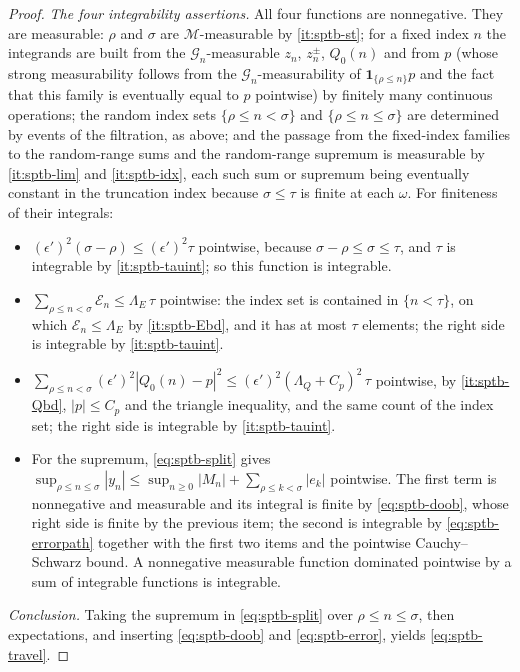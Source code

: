 \begin{proof}
\emph{The four integrability assertions.} All four functions are nonnegative.
They are measurable: $\rho$ and $\sigma$ are $\mathcal M$-measurable by
\ref{it:sptb-st}; for a fixed index $n$ the integrands are built from the
$\mathcal G_n$-measurable $z_n$, $z^\pm_n$, $Q_0(n)$ and from $p$ (whose
strong measurability follows from the $\mathcal G_n$-measurability of
$\mathbf1_{\{\rho\le n\}}p$ and the fact that this family is eventually equal to
$p$ pointwise) by finitely many continuous operations; the random index sets
$\{\rho\le n<\sigma\}$ and $\{\rho\le n\le\sigma\}$ are determined by events of
the filtration, as above; and the passage from the fixed-index families to the
random-range sums and the random-range supremum is measurable by
\ref{it:sptb-lim} and \ref{it:sptb-idx}, each such sum or supremum being
eventually constant in the truncation index because $\sigma\le\tau$ is finite at
each $\omega$. For finiteness of their integrals:
\begin{itemize}
\item $(\epsilon')^2(\sigma-\rho)\le(\epsilon')^2\tau$ pointwise, because
$\sigma-\rho\le\sigma\le\tau$, and $\tau$ is integrable by
\ref{it:sptb-tauint}; so this function is integrable.
\item $\sum_{\rho\le n<\sigma}\mathcal E_n\le\Lambda_E\,\tau$ pointwise: the
index set is contained in $\{n<\tau\}$, on which $\mathcal E_n\le\Lambda_E$ by
\ref{it:sptb-Ebd}, and it has at most $\tau$ elements; the right side is
integrable by \ref{it:sptb-tauint}.
\item $\sum_{\rho\le n<\sigma}(\epsilon')^2|Q_0(n)-p|^2
  \le(\epsilon')^2(\Lambda_Q+C_p)^2\,\tau$ pointwise, by \ref{it:sptb-Qbd},
$|p|\le C_p$ and the triangle inequality, and the same count of the index set;
the right side is integrable by \ref{it:sptb-tauint}.
\item For the supremum, \eqref{eq:sptb-split} gives
$\sup_{\rho\le n\le\sigma}|y_n|\le\sup_{n\ge0}|M_n|
  +\sum_{\rho\le k<\sigma}|e_k|$ pointwise. The first term is nonnegative and
measurable and its integral is finite by \eqref{eq:sptb-doob}, whose right side
is finite by the previous item; the second is integrable by
\eqref{eq:sptb-errorpath} together with the first two items and the pointwise
Cauchy--Schwarz bound. A nonnegative measurable function dominated pointwise by
a sum of integrable functions is integrable.
\end{itemize}

\emph{Conclusion.} Taking the supremum in \eqref{eq:sptb-split} over
$\rho\le n\le\sigma$, then expectations, and inserting \eqref{eq:sptb-doob} and
\eqref{eq:sptb-error}, yields \eqref{eq:sptb-travel}.
\end{proof}
